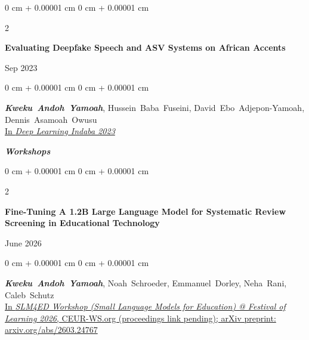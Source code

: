 \documentclass[10pt, letterpaper]{article}
\newenvironment{onecolentry}{
    \begin{adjustwidth}{
        0 cm + 0.00001 cm
    }{
        0 cm + 0.00001 cm
    }
}{
    \end{adjustwidth}
} %
\newenvironment{twocolentry}[2][]{
    \onecolentry
    \def\secondColumn{#2}
    \setcolumnwidth{\fill, 4.5 cm}
    \begin{paracol}{2}
}{
    \switchcolumn \raggedleft \secondColumn
    \end{paracol}
    \endonecolentry
} %
\begin{document}
        \vspace{0.20 cm}
        \begin{samepage}
            \begin{twocolentry}{
                Sep 2023
            }
                \textbf{Evaluating Deepfake Speech and ASV Systems on African Accents}
            \end{twocolentry}
            \vspace{0.10 cm}
            \begin{onecolentry}
                \mbox{\textbf{\textit{Kweku Andoh Yamoah}}}, \mbox{Hussein Baba Fuseini}, \mbox{David Ebo Adjepon-Yamoah}, \mbox{Dennis Asamoah Owusu} \\
                \vspace{0.10 cm}
                \href{https://openreview.net/forum?id=j26ZkJ7w64}{In \textit{Deep Learning Indaba 2023}}
                \end{onecolentry}
        \end{samepage}

        \vspace{0.50 cm}
        \large \textit{\textbf{Workshops}}
        \vspace{0.10 cm}
        \normalsize

        \vspace{0.20 cm}
        \begin{samepage}
            \begin{twocolentry}{
                June 2026
            }
                \textbf{Fine-Tuning A 1.2B Large Language Model for Systematic Review Screening in Educational Technology}
            \end{twocolentry}
            \vspace{0.10 cm}
            \begin{onecolentry}
                \mbox{\textbf{\textit{Kweku Andoh Yamoah}}}, \mbox{Noah Schroeder}, \mbox{Emmanuel Dorley}, \mbox{Neha Rani}, \mbox{Caleb Schutz} \\
                \vspace{0.10 cm}
                \href{https://arxiv.org/pdf/2603.24767}{In \textit{SLM4ED Workshop (Small Language Models for Education) @ Festival of Learning 2026}, CEUR-WS.org (proceedings link pending); arXiv preprint: arxiv.org/abs/2603.24767}
                \end{onecolentry}
        \end{samepage}
\end{document}
